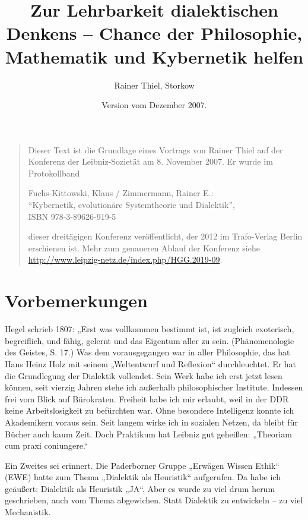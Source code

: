 \documentclass[11pt,a4paper]{article}
\title{Zur Lehrbarkeit dialektischen Denkens – Chance der
  Philosophie, Mathematik und Kybernetik helfen}
\author{Rainer Thiel, Storkow}
\date{Version vom Dezember 2007.}
\begin{document}
\maketitle

\begin{quote}
  Dieser Text ist die Grundlage eines Vortrags von Rainer Thiel auf der
  Konferenz der Leibniz-Sozietät am 8. November 2007. Er wurde im
  Protokollband
  
  Fuchs-Kittowski, Klaus / Zimmermann, Rainer E.:\\ “Kybernetik, evolutionäre
  Systemtheorie und Dialektik”,\\ ISBN 978-3-89626-919-5
  
  dieser dreitägigen Konferenz veröffentlicht, der 2012 im Trafo-Verlag Berlin
  erschienen ist.  Mehr zum genaueren Ablauf der Konferenz siehe\\
  \url{http://www.leipzig-netz.de/index.php/HGG.2019-09}.   
\end{quote}

\section{Vorbemerkungen}

Hegel schrieb 1807: „Erst was vollkommen bestimmt ist, ist zugleich
exoterisch, begreiflich, und fähig, gelernt und das Eigentum aller zu sein.
(Phänomenologie des Geistes, S. 17.) Was dem vorausgegangen war in aller
Philosophie, das hat Hans Heinz Holz mit seinem „Weltentwurf und Reflexion“
durchleuchtet. Er hat die Grundlegung der Dialektik vollendet. Sein Werk habe
ich erst jetzt lesen können, seit vierzig Jahren stehe ich außerhalb
philosophischer Institute. Indessen frei vom Blick auf Bürokraten. Freiheit
habe ich mir erlaubt, weil in der DDR keine Arbeitslosigkeit zu befürchten
war. Ohne besondere Intelligenz konnte ich Akademikern voraus sein. Seit
langem wirke ich in sozialen Netzen, da bleibt für Bücher auch kaum Zeit. Doch
Praktikum hat Leibniz gut geheißen: „Theoriam cum praxi coniungere.“

Ein Zweites sei erinnert. Die Paderborner Gruppe „Erwägen Wissen Ethik“ (EWE)
hatte zum Thema „Dialektik als Heuristik“ aufgerufen. Da habe ich geäußert:
Dialektik als Heuristik „JA“. Aber es wurde zu viel drum herum geschrieben,
auch vom Thema abgewichen. Statt Dialektik zu entwickeln – zu viel
Mechanistik.
\end{document}
